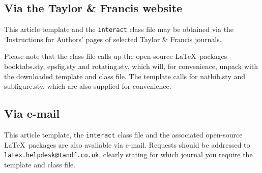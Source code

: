 \documentclass[]{interact}
\theoremstyle{plain}%
\theoremstyle{definition}
\theoremstyle{remark}
\begin{document}
\subsection{Via the Taylor \& Francis website}

This article template and the \texttt{interact} class file may be obtained via the `Instructions for Authors' pages of selected Taylor \& Francis journals.

Please note that the class file calls up the open-source \LaTeX\ packages booktabs.sty, epsfig.sty and rotating.sty, which will, for convenience, unpack with the downloaded template and class file. The template calls for natbib.sty and subfigure.sty, which are also supplied for convenience.


\subsection{Via e-mail}

This article template, the \texttt{interact} class file and the associated open-source \LaTeX\ packages are also available via e-mail. Requests should be addressed to \texttt{latex.helpdesk@tandf.co.uk}, clearly stating for which journal you require the template and class file.
\end{document}
